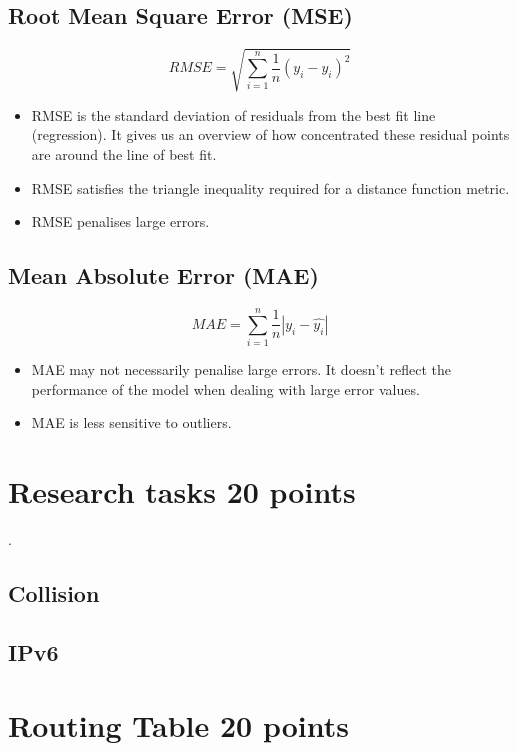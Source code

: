 \documentclass{resources/WeSTassignment}
\begin{document}
\subsection{ Root Mean Square Error (MSE)}
\[ RMSE =\sqrt{ \sum_{i=1}^{n}\frac{1}{n} (y_i-\hat{y_i} )^2} \]
\begin{itemize}
\item RMSE is the standard deviation of residuals from the best fit line (regression). It gives us an overview of how concentrated these residual points are around the line of best fit.
\item RMSE satisfies the triangle inequality required for a distance function metric.
\item RMSE penalises large errors.
\end{itemize}
\subsection{Mean Absolute Error (MAE)}  
\[ MAE = \sum_{i=1}^{n}\frac{1}{n} |y_i-\hat{y_i}| \]
\begin{itemize}
\item MAE may not necessarily penalise large errors. It doesn't reflect the performance of the model when dealing with large error values.
\item MAE is less sensitive to outliers.
\end{itemize}
\section{Research tasks \hfill {20 points}}
.
\subsection{Collision}


\subsection{IPv6}


\section{Routing Table \hfill {20 points}}
\end{document}
